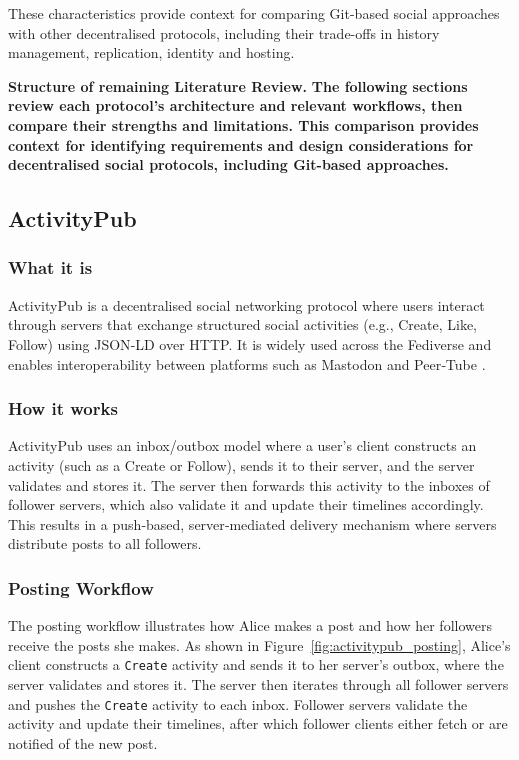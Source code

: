 These characteristics provide context for comparing Git-based social approaches with other decentralised protocols, including their trade-offs in history management, replication, identity and hosting.

\textbf{Structure of remaining Literature Review.}
\textbf{The following sections review each protocol's architecture and relevant workflows, then compare their strengths and limitations. This comparison provides context for identifying requirements and design considerations for decentralised social protocols, including Git-based approaches.}

\subsection{ActivityPub}

\subsubsection{What it is}
ActivityPub is a decentralised social networking protocol where users interact through servers that exchange structured social activities (e.g., Create, Like, Follow) using JSON‑LD over HTTP. It is widely used across the Fediverse and enables interoperability between platforms such as Mastodon and Peer‑Tube \cite{w3cActivityPub2018}.

\subsubsection{How it works}
ActivityPub uses an inbox/outbox model where a user’s client constructs an activity (such as a Create or Follow), sends it to their server, and the server validates and stores it. The server then forwards this activity to the inboxes of follower servers, which also validate it and update their timelines accordingly. This results in a push‑based, server‑mediated delivery mechanism where servers distribute posts to all followers.

\subsubsection{Posting Workflow}
The posting workflow illustrates how Alice makes a post and how her followers receive the posts she makes. As shown in Figure~\ref{fig:activitypub_posting}, Alice's client constructs a \texttt{Create} activity and sends it to her server's outbox, where the server validates and stores it. The server then iterates through all follower servers and pushes the \texttt{Create} activity to each inbox. Follower servers validate the activity and update their timelines, after which follower clients either fetch or are notified of the new post.

